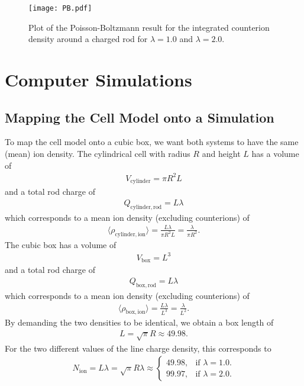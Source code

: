 \documentclass[a4paper,10pt,bibtotoc]{scrartcl}
\begin{document}
\begin{figure}[h]
\centering
\texttt{[image: PB.pdf]}
\caption{Plot of the Poisson-Boltzmann result for the integrated counterion density around a charged rod for $\lambda=1.0$ and $\lambda=2.0$.}
\label{fig:PB}
\end{figure}




\section{Computer Simulations}
\subsection{Mapping the Cell Model onto a Simulation}
To map the cell model onto a cubic box, we want both systems to have the same (mean) ion density. The cylindrical cell with radius $R$ and height $L$ has a volume of 
\begin{align}
 V_\mathrm{cylinder} = \pi R^2 L
\end{align}
and a total rod charge of
\begin{align}
 Q_\mathrm{cylinder,rod} = L\lambda
\end{align}
which corresponds to a mean ion density (excluding counterions) of
\begin{align}
 \langle\rho_\mathrm{cylinder, ion}\rangle = \frac{L\lambda}{\pi R^2 L} = \frac{\lambda}{\pi R^2}.
\end{align}
The cubic box has a volume of
\begin{align}
 V_\mathrm{box} = L^3
\end{align}
and a total rod charge of
\begin{align}
 Q_\mathrm{box,rod} = L\lambda
\end{align}
which corresponds to a mean ion density (excluding counterions) of
\begin{align}
 \langle\rho_\mathrm{box, ion}\rangle = \frac{L\lambda}{L^3} = \frac{\lambda}{L^2}.
\end{align}
By demanding the two densities to be identical, we obtain a box length of
\begin{align}
 L = \sqrt{\pi} R \approx 49.98.
\end{align}
For the two different values of the line charge density, this corresponds to 
\begin{align}
 N_{\mathrm{ion}} = L\lambda = \sqrt{\pi} R \lambda \approx \begin{cases}
    49.98, & \text{if $\lambda=1.0$}.\\
    99.97, & \text{if $\lambda=2.0$}.
  \end{cases}
\end{align}
\end{document}
